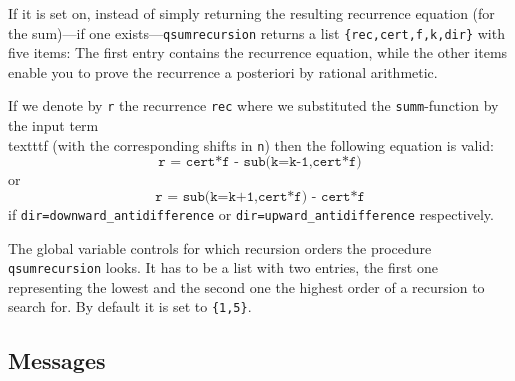 \begin{itemize}
		If it is set on, instead of simply returning the
		resulting recurrence equation (for the sum)---if one
		exists---\texttt{qsumrecursion} returns
		a list \texttt{\{rec,cert,f,k,dir\}} with
		five items: The first entry contains the
		recurrence equation, while the other items enable you to
		prove the recurrence a posteriori by rational arithmetic.

		If we denote by \texttt{r} the recurrence
		\texttt{rec} where we substituted the \texttt{summ}-function
		by the input term \\texttt{f} (with the corresponding shifts
		in \texttt{n}) then the following equation is valid:
		\[  \texttt{r = cert*f - sub(k=k-1,cert*f)}  \]
		or
		\[  \texttt{r = sub(k=k+1,cert*f) - cert*f}  \]
		if \texttt{dir=downward\_antidifference} or
		\texttt{dir=upward\_antidifference} respectively.
\end{itemize}

The global variable  controls for
which recursion orders the procedure \texttt{qsumrecursion} looks.
It has to be a list with two entries, the first one representing
the lowest and the second one the highest order of a recursion
to search for. By default it is set to \texttt{\{1,5\}}.


\subsection{Messages}

